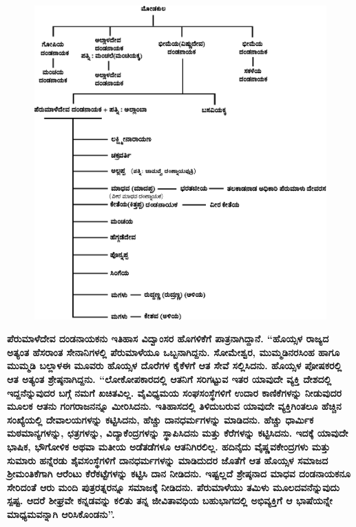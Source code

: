 \begin{figure}[H]
\includegraphics[scale=.28]{images/chap3/chap3fig24.jpeg}
\end{figure}

\textbf{ಪೆರುಮಾಳೆದೇವ ದಂಡನಾಯಕನು ಇತಿಹಾಸ ವಿದ್ವಾಂಸರ ಹೊಗಳಿಕೆಗೆ ಪಾತ್ರನಾಗಿದ್ದಾನೆ. “ಹೊಯ್ಸಳ ರಾಜ್ಯದ ಅತ್ಯಂತ ಹೆಸರಾಂತ ಸೇನಾನಿಗಳಲ್ಲಿ ಪೆರುಮಾಳೆಯೂ ಒಬ್ಬನಾಗಿದ್ದನು. ಸೋಮೇಶ್ವರ, ಮುಮ್ಮಡಿನರಸಿಂಹ ಹಾಗೂ ಮುಮ್ಮಡಿ ಬಲ್ಲಾಳ\general{\enginline{-}}ಈ ಮೂವರು ಹೊಯ್ಸಳ ದೊರೆಗಳ ಕೈಕೆಳಗೆ ಆತ ಸೇವೆ ಸಲ್ಲಿಸಿದನು. ಹೊಯ್ಸಳ ಪೋಷಕರಲ್ಲಿ ಆತ ಅತ್ಯಂತ ಶ್ರೇಷ್ಠನಾಗಿದ್ದನು. “ಲೋಕೋಪಕಾರದಲ್ಲಿ ಆತನಿಗೆ ಸರಿಗಟ್ಟುವ ಇತರ ಯಾವುದೇ ವ್ಯಕ್ತಿ ದೇಶದಲ್ಲಿ ಇದ್ದನೆನ್ನುವುದರ ಬಗ್ಗೆ ನಮಗೆ ಖಚಿತವಿಲ್ಲ. ವೈವಿಧ್ಯಮಯ ಸಂಘಸಂಸ್ಥೆಗಳಿಗೆ ಉದಾರ ಕಾಣಿಕೆಗಳನ್ನು ನೀಡುವುದರ ಮೂಲಕ ಆತನು ಗಂಗರಾಜನನ್ನೂ ಮೀರಿಸಿದನು. ಇತಿಹಾಸದಲ್ಲಿ ತಿಳಿದುಬರುವ ಯಾವುದೇ ವ್ಯಕ್ತಿಗಿಂತಲೂ ಹೆಚ್ಚಿನ ಸಂಖ್ಯೆಯಲ್ಲಿ ದೇವಾಲಯಗಳನ್ನು ಕಟ್ಟಿಸಿದನು, ಹೆಚ್ಚು ದಾನಧರ್ಮಗಳನ್ನು ಮಾಡಿದನು. ಹೆಚ್ಚು ಧಾರ್ಮಿಕ ಮಠಮಾನ್ಯಗಳನ್ನು, ಛತ್ರಗಳನ್ನು, ವಿದ್ಯಾಕೆಂದ್ರಗಳನ್ನು ಸ್ಥಾಪಿಸಿದನು ಮತ್ತು ಕೆರೆಗಳನ್ನು ಕಟ್ಟಿಸಿದನು. ಇದಕ್ಕೆ ಯಾವುದೇ ಭಾಷಿಕ, ಭೌಗೋಳಿಕ ಅಥವಾ ಮತೀಯ ಅಡೆತಡೆಗಳೂ ಆತನಿಗಿರಲಿಲ್ಲ. ಹದಿನೈದು ವೈಷ್ಣವಕೇಂದ್ರಗಳು ಮತ್ತು ಸುಮಾರು ಹನ್ನೆರಡು ಶೈವಸಂಸ್ಥೆಗಳಿಗೆ ದಾನಧರ್ಮಗಳನ್ನು ಮಾಡಿದುದರ ಜೊತೆಗೆ ಆತ ಹೊಯ್ಸಳ ಸಮಾಜದ ಶ‍್ರೀಮಂತಿಕೆಗಾಗಿ ಆರೆಂಟು ಕೆರೆಕಟ್ಟೆಗಳನ್ನು ಕಟ್ಟಿಸಿ ದಾನ ನೀಡಿದನು. ಇಷ್ಟಲ್ಲದೆ ಶ್ರೇಷ್ಠನಾದ ಮಾಧವ ದಂಡನಾಯಕನೂ ಸೇರಿದಂತೆ ಆರು ಮಂದಿ ಪುತ್ರರತ್ನರನ್ನೂ ಸಮಾಜಕ್ಕೆ ನೀಡಿದನು. ಪೆರುಮಾಳೆಯು ತಮಿಳು ಮೂಲದವನೆನ್ನುವುದು ಸ್ಪಷ್ಟ. ಆದರೆ ಶೀಘ್ರವೇ ಕನ್ನಡವನ್ನು ಕಲಿತು ತನ್ನ ಜೀವಿತಾವಧಿಯ ಬಹುಭಾಗದಲ್ಲಿ ಅಭಿವ್ಯಕ್ತಿಗೆ ಆ ಭಾಷೆಯನ್ನೇ ಮಾಧ್ಯಮವನ್ನಾಗಿ ಆರಿಸಿಕೊಂಡನು”.}

